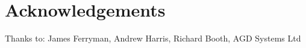\section{Acknowledgements}
Thanks to: James Ferryman, Andrew Harris, Richard Booth, AGD Systems Ltd
\pagebreak
